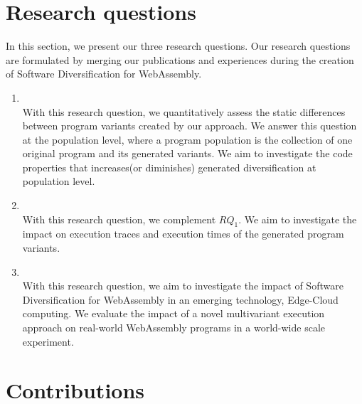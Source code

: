 \section{Research questions}
\label{intro:definition:rq}

In this section, we present our three research questions. Our research questions are formulated by merging our publications and experiences during the creation of Software Diversification for WebAssembly. 

\begin{enumerate}[label=\subscript{RQ}{{\arabic*}}]
    \item \textbf{\rqone}\\
    With this research question, we quantitatively assess the static differences between program variants created by our approach. We answer this question at the population level, where a program population is the collection of one original program and its generated variants. We aim to investigate the code properties that increases(or diminishes) generated diversification at population level. 

    \item \textbf{\rqtwo} \\
    With this research question, we complement $RQ_1$. We aim to investigate the impact on execution traces and execution times of the generated program variants.

    \item \textbf{\rqthree} \\
    With this research question, we aim to investigate the impact of Software Diversification for WebAssembly in an emerging technology, Edge-Cloud computing. We evaluate the impact of a novel multivariant execution approach on real-world WebAssembly programs in a world-wide scale experiment.
    
    
\end{enumerate}


\renewcommand{\rqone}{$RQ_1$.To what extent can we artifically generate program variants for WebAssembly?}

\renewcommand{\rqtwo}{$RQ_2$.To what extent are the generated variants dynamically different?}
\renewcommand{\rqthree}{$RQ_3$.To what extent do the artificial variants exhibit different execution times on Edge-Cloud platforms?}

\section{Contributions}

